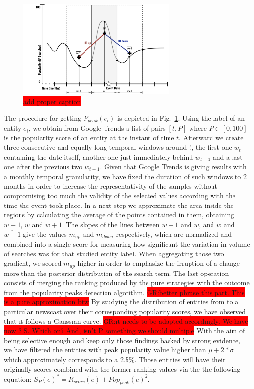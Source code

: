 \documentclass{llncs}
\newcommand{\todo}[1]{\colorbox{red}{#1}}
\begin{document}
\begin{figure}[h!]
\centering
\includegraphics[width=0.7\textwidth]{figure/PopularityMeasure}
\caption{\todo{add proper caption}}
\label{fig:PopularityMeasure}%
\end{figure}

The procedure for getting $P_{peak}(e_i)$ is depicted in Fig.~\ref{fig:PopularityMeasure}. Using the label of an entity $e_i$, we obtain from Google Trends a list of pairs $[t, P]$ where $P\in[0,100]$ is the popularity score of an entity at the instant of time $t$. Afterward we create three consecutive and equally long temporal windows around $t$, the first one $w_{t}$ containing the date itself, another one just immediately behind $w_{t-1}$ and a last one after the previous two $w_{t+1}$. Given that Google Trends is giving results with a monthly temporal granularity, we have fixed the duration of such windows to 2 months in order to increase the representativity of the samples without compromising too much the validity of the selected values according with the time the event took place. 
In a next step we approximate the area inside the regions by calculating the average of the points contained in them, obtaining $\overline{w-1}$, $\overline{w}$ and $\overline{w+1}$. The slopes of the lines between $\overline{w-1}$ and $\overline{w}$, and $\overline{w}$ and $\overline{w+1}$ give the values $m_{up}$ and $m_{down}$ respectively, which are normalized and combined into a single score for measuring how significant the variation in volume of searches was for that studied entity label. When aggregating those two gradient, we scored $m_{up}$ higher in order to emphasize the irruption of a change more than the posterior distribution of the search term.
The last operation consists of merging the ranking produced by the pure strategies with the outcome from the popularity peaks detection algorithm. 
\todo{GR:better phrase this part. This is a pure approximation btw}
By studying the distribution of entities from to a particular newscast over their corresponding popularity scores, we have observed that it follows a Gaussian curve. 
\todo{GR:it needs to be adapted accordingly. We have now 3 S. Which on? And, isn't P something we should multiple}
With the aim of being selective enough and keep only those findings backed by strong evidence, we have filtered the entities with peak popularity value higher than $\mu+2*\sigma$ which approximately corresponds to a 2.5\%. Those entities will have their originally scores combined with the former ranking values via the the following equation: $S_{P}\left ( e \right )^{*} =  R_{score}\left ( e \right ) +Pop_{peak}(e)^{2} $.
\end{document}
